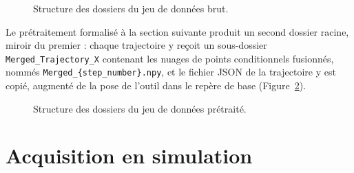 \begin{figure}[H]
\centering
\begin{minipage}{0.8\textwidth} %
\end{minipage}
\caption{Structure des dossiers du jeu de données brut.}
\label{fig:dir_tree}
\end{figure}

Le prétraitement formalisé à la section suivante produit un second dossier racine, miroir du premier : chaque trajectoire y reçoit un sous-dossier
\texttt{Merged\_Trajectory\_X} contenant les nuages de points conditionnels fusionnés, nommés
\texttt{Merged\_\{step\_number\}.npy}, et le fichier \ac{JSON} de la trajectoire y est copié, augmenté de la pose de l'outil dans le repère de base (Figure~\ref{fig:preprocess_dir_tree}).

\begin{figure}[H]
\centering
\begin{minipage}{0.8\textwidth}
\end{minipage}
\caption{Structure des dossiers du jeu de données prétraité.}
\label{fig:preprocess_dir_tree}
\end{figure}

\section*{Acquisition en simulation}

